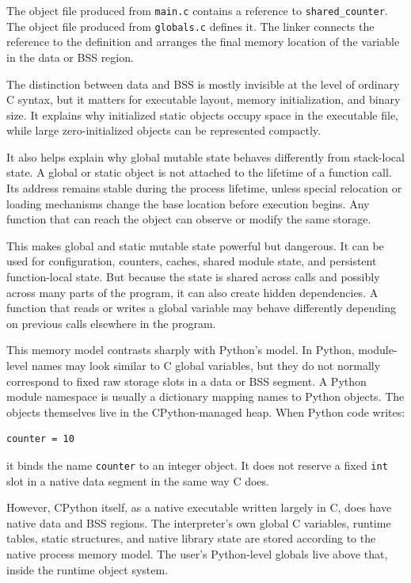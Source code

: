 The object file produced from \texttt{main.c} contains a reference to \texttt{shared\_counter}. The object file produced from \texttt{globals.c} defines it. The linker connects the reference to the definition and arranges the final memory location of the variable in the data or BSS region.

The distinction between data and BSS is mostly invisible at the level of ordinary C syntax, but it matters for executable layout, memory initialization, and binary size. It explains why initialized static objects occupy space in the executable file, while large zero-initialized objects can be represented compactly.

It also helps explain why global mutable state behaves differently from stack-local state. A global or static object is not attached to the lifetime of a function call. Its address remains stable during the process lifetime, unless special relocation or loading mechanisms change the base location before execution begins. Any function that can reach the object can observe or modify the same storage.

This makes global and static mutable state powerful but dangerous. It can be used for configuration, counters, caches, shared module state, and persistent function-local state. But because the state is shared across calls and possibly across many parts of the program, it can also create hidden dependencies. A function that reads or writes a global variable may behave differently depending on previous calls elsewhere in the program.

This memory model contrasts sharply with Python's model. In Python, module-level names may look similar to C global variables, but they do not normally correspond to fixed raw storage slots in a data or BSS segment. A Python module namespace is usually a dictionary mapping names to Python objects. The objects themselves live in the CPython-managed heap. When Python code writes:

\begin{verbatim}
counter = 10
\end{verbatim}

it binds the name \texttt{counter} to an integer object. It does not reserve a fixed \texttt{int} slot in a native data segment in the same way C does.

However, CPython itself, as a native executable written largely in C, does have native data and BSS regions. The interpreter's own global C variables, runtime tables, static structures, and native library state are stored according to the native process memory model. The user's Python-level globals live above that, inside the runtime object system.

